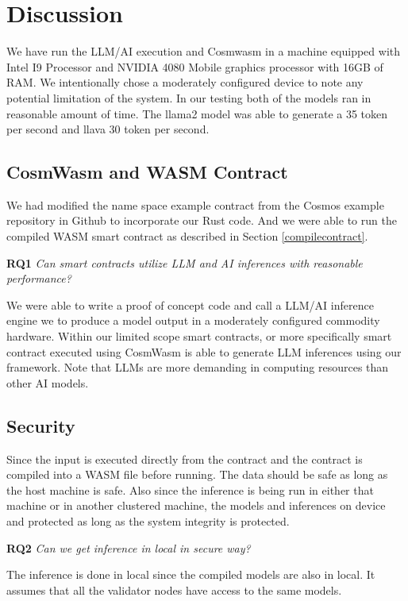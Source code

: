 \section{Discussion}
We have run the LLM/AI execution and Cosmwasm in a machine equipped with Intel I9 Processor and NVIDIA 4080 Mobile graphics processor with 16GB of RAM. We intentionally chose a moderately configured device to note any potential limitation of the system. In our testing both of the models ran in reasonable amount of time. The llama2 model was able to generate a 35 token per second and llava 30 token per second.  

\subsection{CosmWasm and WASM Contract}
We had modified the name space example contract from the Cosmos example repository in Github to incorporate our Rust code. And we were able to run the compiled WASM smart contract as described in Section \ref{compilecontract}.

\begin{tcolorbox}
\textbf{RQ1} \textit{Can smart contracts utilize LLM and AI inferences with reasonable performance?}

We were able to write a proof of concept code and call a LLM/AI inference engine we to produce a model output in a moderately configured commodity hardware. Within our limited scope smart contracts, or more specifically smart contract executed using CosmWasm is able to generate LLM inferences using our framework. Note that LLMs are more demanding in computing resources than other AI models. 
\end{tcolorbox}

\subsection{Security}

Since the input is executed directly from the contract and the contract is compiled into a WASM file before running. The data should be safe as long as the host machine is safe. Also since the inference is being run in either that machine or in another clustered machine, the models and inferences on device and protected as long as the system integrity is protected.

\begin{tcolorbox}
\textbf{RQ2} \textit{Can we get inference in local in secure way?}

The inference is done in local since the compiled models are also in local. It assumes that all the validator nodes have access to the same models.
\end{tcolorbox}

